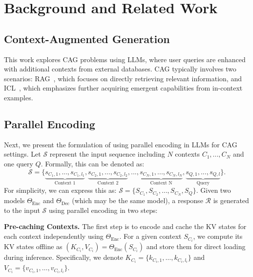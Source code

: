 \section{Background and Related Work}
\label{Preliminaries}

\subsection{Context-Augmented Generation}

This work explores CAG problems using LLMs, where user queries are enhanced with additional contexts from external databases. CAG typically involves two scenarios: RAG~\citep{asai2024reliable, gupta2024rag, gao2023retrieval}, which focuses on directly retrieving relevant information, and ICL~\citep{dong2022survey, wei2022emergent, agarwal2024many}, which emphasizes further acquiring
emergent capabilities from in-context examples.

\subsection{Parallel Encoding}
\label{sec:2.2}

Next, we present the formulation of using parallel encoding in LLMs for CAG settings. Let $\mathcal{S}$ represent the input sequence including $N$ contexts $C_1, ..., C_{N}$ and one query $Q$. Formally, this can be denoted as:
\begin{equation}
\mathcal{S} = \{\underbrace{s_{C_1, 1}, ... , s_{C_1, l_1}}_{\text{Context 1}}, \underbrace{s_{C_2, 1}, ..., s_{C_2, l_2}}_{\text{Context 2}}, ..., \underbrace{s_{C_N, 1}, ..., s_{C_N, l_N}}_{\text{Context N}}, \underbrace{s_{Q, 1}, ..., s_{Q, l}}_{\text{Query}}\}.
\end{equation}
For simplicity, we can express this as:
$\mathcal{S} = \{S_{C_1}, S_{C_2}, \ldots, S_{C_N}, S_Q\}$. Given two models $\Theta_{\text{Enc}}$ and $\Theta_{\text{Dec}}$ (which may be the same model), a response $\mathcal{R}$ is generated to the input $\mathcal{S}$ using parallel encoding in two steps:

\textbf{Pre-caching Contexts.} The first step is to encode and cache the KV states for each context independently using $\Theta_{\text{Enc}}$. For a given context $S_{C_i}$, we compute its KV states offline as $(K_{C_i}, V_{C_i}) = \Theta_{\text{Enc}}(S_{C_i})$ and store them for direct loading during inference. Specifically, we denote $K_{C_i} = \{k_{C_i, 1}, \ldots , k_{C_i, l_i}\}$ and $V_{C_i} = \{v_{C_i, 1}, \ldots , v_{C_i, l_i}\}$.

